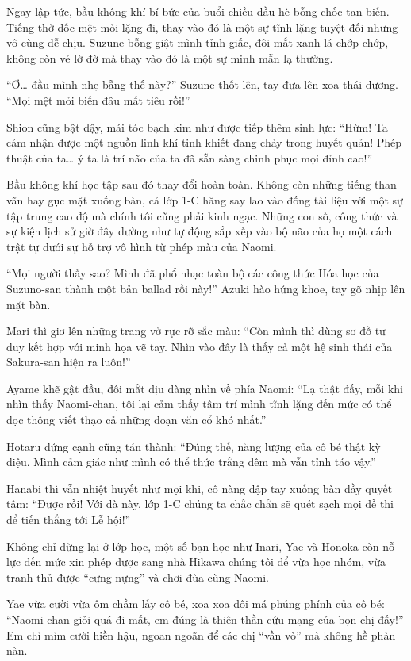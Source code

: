 \documentclass[../main.tex]{subfiles}
\begin{document}
Ngay lập tức, bầu không khí bí bức của buổi chiều đầu hè bỗng chốc tan biến. Tiếng thở dốc mệt mỏi lặng đi, thay vào đó là một sự tĩnh lặng tuyệt đối nhưng vô cùng dễ chịu. Suzune bỗng giật mình tỉnh giấc, đôi mắt xanh lá chớp chớp, không còn vẻ lờ đờ mà thay vào đó là một sự minh mẫn lạ thường.

``Ơ\dots{} đầu mình nhẹ bẫng thế này?'' Suzune thốt lên, tay đưa lên xoa thái dương. ``Mọi mệt mỏi biến đâu mất tiêu rồi!''

Shion cũng bật dậy, mái tóc bạch kim như được tiếp thêm sinh lực: ``Hừm! Ta cảm nhận được một nguồn linh khí tinh khiết đang chảy trong huyết quản! Phép thuật của ta\dots{} ý ta là trí não của ta đã sẵn sàng chinh phục mọi đỉnh cao!''

Bầu không khí học tập sau đó thay đổi hoàn toàn. Không còn những tiếng than vãn hay gục mặt xuống bàn, cả lớp 1-C hăng say lao vào đống tài liệu với một sự tập trung cao độ mà chính tôi cũng phải kinh ngạc. Những con số, công thức và sự kiện lịch sử giờ đây dường như tự động sắp xếp vào bộ não của họ một cách trật tự dưới sự hỗ trợ vô hình từ phép màu của Naomi.

``Mọi người thấy sao? Mình đã phổ nhạc toàn bộ các công thức Hóa học của Suzuno-san thành một bản ballad rồi này!'' Azuki hào hứng khoe, tay gõ nhịp lên mặt bàn.

Mari thì giơ lên những trang vở rực rỡ sắc màu: ``Còn mình thì dùng sơ đồ tư duy kết hợp với minh họa vẽ tay. Nhìn vào đây là thấy cả một hệ sinh thái của Sakura-san hiện ra luôn!''

Ayame khẽ gật đầu, đôi mắt dịu dàng nhìn về phía Naomi: ``Lạ thật đấy, mỗi khi nhìn thấy Naomi-chan, tôi lại cảm thấy tâm trí mình tĩnh lặng đến mức có thể đọc thông viết thạo cả những đoạn văn cổ khó nhất.''

Hotaru đứng cạnh cũng tán thành: ``Đúng thế, năng lượng của cô bé thật kỳ diệu. Mình cảm giác như mình có thể thức trắng đêm mà vẫn tỉnh táo vậy.''

Hanabi thì vẫn nhiệt huyết như mọi khi, cô nàng đập tay xuống bàn đầy quyết tâm: ``Được rồi! Với đà này, lớp 1-C chúng ta chắc chắn sẽ quét sạch mọi đề thi để tiến thẳng tới Lễ hội!''

\ct

Không chỉ dừng lại ở lớp học, một số bạn học như Inari, Yae và Honoka còn nỗ lực đến mức xin phép được sang nhà Hikawa chúng tôi để vừa học nhóm, vừa tranh thủ được ``cưng nựng'' và chơi đùa cùng Naomi.

Yae vừa cười vừa ôm chầm lấy cô bé, xoa xoa đôi má phúng phính của cô bé: ``Naomi-chan giỏi quá đi mất, em đúng là thiên thần cứu mạng của bọn chị đấy!'' Em chỉ mỉm cười hiền hậu, ngoan ngoãn để các chị ``vần vò'' mà không hề phàn nàn.
\end{document}
